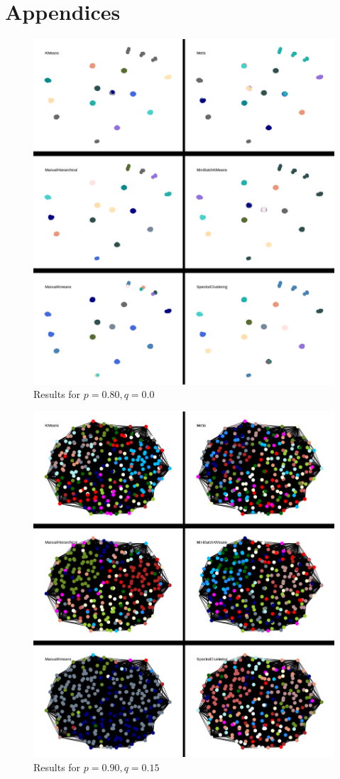 \documentclass{article}
\begin{document}
\section{Appendices}\label{app-clustering}
\begin{figure}[H]
    \label{fig:results_p-80_q-00}
    \centering
    \includegraphics[width=.85\textwidth]{results/results_p-80_q-00.png}
    \caption[Clustering for $p=0.80,q=0.0$]{Results for $p=0.80,q=0.0$}
\end{figure}

\begin{figure}
    \label{fig:results_p-90_q-15}
    \centering
    \includegraphics[width=1.0\textwidth]{results/results_p-90_q-15.png}
    \caption[Clustering for $p=0.90,q=0.15$]{Results for $p=0.90,q=0.15$}
\end{figure}
\end{document}

